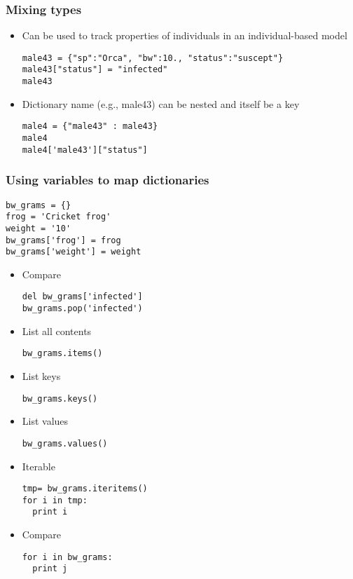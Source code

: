 \documentclass{beamer}
\begin{document}
\begin{frame}[fragile]
\frametitle{Mixing types}
\begin{itemize}
\item Can be used to track properties of individuals in an individual-based model
\begin{lstlisting}
male43 = {"sp":"Orca", "bw":10., "status":"suscept"}
male43["status"] = "infected"
male43
\end{lstlisting}
\item Dictionary name (e.g., male43) can be nested and itself be a key
\begin{lstlisting}
male4 = {"male43" : male43}
male4
male4['male43']["status"]
\end{lstlisting}
\end{itemize}
\end{frame}

\begin{frame}[fragile]
\frametitle{Using variables to map dictionaries}
\begin{lstlisting}
bw_grams = {}
frog = 'Cricket frog'
weight = '10'
bw_grams['frog'] = frog
bw_grams['weight'] = weight
\end{lstlisting}
\end{frame}

\begin{frame}[fragile]
\begin{itemize}
\frametitle{Deleting a key}
\item Compare
\begin{lstlisting}
del bw_grams['infected']
bw_grams.pop('infected')
\end{lstlisting}
\end{itemize}
\end{frame}

\begin{frame}[fragile]
\begin{itemize}
\frametitle{Other methods}
\item List all contents
\begin{lstlisting}
bw_grams.items()
\end{lstlisting}
\item List keys
\begin{lstlisting}
bw_grams.keys()
\end{lstlisting}
\item List values
\begin{lstlisting}
bw_grams.values()
\end{lstlisting}
\item Iterable
\begin{lstlisting}
tmp= bw_grams.iteritems()
for i in tmp: 
  print i
\end{lstlisting}
\item Compare
\begin{lstlisting}
for i in bw_grams: 
  print j
\end{lstlisting}
\end{itemize}
\end{frame}
\end{document}
